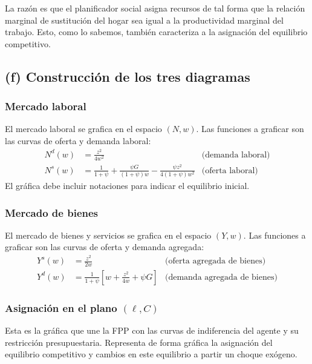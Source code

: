 \documentclass[11pt]{article}
\begin{document}
La razón es que el planificador social asigna recursos de tal forma que la relación marginal de sustitución del hogar sea igual a la productividad marginal del trabajo. Esto, como lo sabemos, también caracteriza a la asignación del equilibrio competitivo.

\subsection*{(f) Construcción de los tres diagramas}

\subsubsection*{Mercado laboral}
El mercado laboral se grafica en el espacio $(N,w)$. Las funciones a graficar son las curvas de oferta y demanda laboral:
\begin{equation}
  \boxed{
    \begin{aligned}
      N^d(w) &= \frac{z^2}{4w^2}
        & \text{(demanda laboral)} \\[2mm]
      N^s(w) &= \frac{1}{1+\psi}+\frac{\psi G}{(1+\psi)w}-\frac{\psi z^2}{4(1+\psi)w^2}
        & \text{(oferta laboral)}
    \end{aligned}
  }
\end{equation}
El gráfica debe incluir notaciones para indicar el equilibrio inicial.

\subsubsection*{Mercado de bienes}
El mercado de bienes y servicios se grafica en el espacio $(Y,w)$. Las funciones a graficar son las curvas de oferta y demanda agregada:
\begin{equation}
  \boxed{
    \begin{aligned}
      Y^s(w) &= \frac{z^2}{2w}
        & \text{(oferta agregada de bienes)} \\[2mm]
      Y^d(w) &= \frac{1}{1+\psi}\left[w+\frac{z^2}{4w}+\psi G\right]
        & \text{(demanda agregada de bienes)}
    \end{aligned}
  }
\end{equation}

\subsubsection*{Asignación en el plano $(\ell,C)$}
Esta es la gráfica que une la FPP con las curvas de indiferencia del agente y su restricción presupuestaria. Representa de forma gráfica la asignación del equilibrio competitivo y cambios en este equilibrio a partir un choque exógeno.
\end{document}
